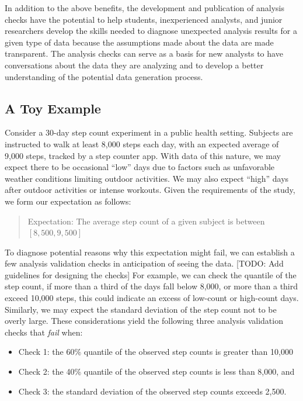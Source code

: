 \documentclass[
  12pt,
]{interact}
\providecommand{\tightlist}{%
  \setlength{\itemsep}{0pt}\setlength{\parskip}{0pt}}
\begin{document}
In addition to the above benefits, the development and publication of
analysis checks have the potential to help students, inexperienced
analysts, and junior researchers develop the skills needed to diagnose
unexpected analysis results for a given type of data because the
assumptions made about the data are made transparent. The analysis
checks can serve as a basis for new analysts to have conversations about
the data they are analyzing and to develop a better understanding of the
potential data generation process.

\subsection{A Toy Example}\label{sec-toy}

Consider a 30-day step count experiment in a public health setting.
Subjects are instructed to walk at least 8,000 steps each day, with an
expected average of 9,000 steps, tracked by a step counter app. With
data of this nature, we may expect there to be occasional ``low'' days
due to factors such as unfavorable weather conditions limiting outdoor
activities. We may also expect ``high'' days after outdoor activities or
intense workouts. Given the requirements of the study, we form our
expectation as follows:

\begin{quote}
Expectation: The average step count of a given subject is between
\([8,500, 9,500]\)
\end{quote}

To diagnose potential reasons why this expectation might fail, we can
establish a few analysis validation checks in anticipation of seeing the
data. {[}TODO: Add guidelines for designing the checks{]} For example,
we can check the quantile of the step count, if more than a third of the
days fall below 8,000, or more than a third exceed 10,000 steps, this
could indicate an excess of low-count or high-count days. Similarly, we
may expect the standard deviation of the step count not to be overly
large. These considerations yield the following three analysis
validation checks that \emph{fail} when:

\begin{itemize}
\tightlist
\item
  Check 1: the 60\% quantile of the observed step counts is greater than
  10,000
\item
  Check 2: the 40\% quantile of the observed step counts is less than
  8,000, and
\item
  Check 3: the standard deviation of the observed step counts exceeds
  2,500.
\end{itemize}
\end{document}
